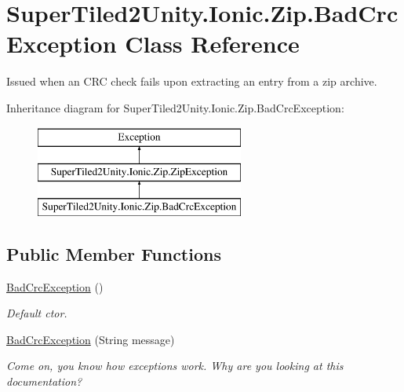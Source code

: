 \hypertarget{class_super_tiled2_unity_1_1_ionic_1_1_zip_1_1_bad_crc_exception}{}\section{Super\+Tiled2\+Unity.\+Ionic.\+Zip.\+Bad\+Crc\+Exception Class Reference}
\label{class_super_tiled2_unity_1_1_ionic_1_1_zip_1_1_bad_crc_exception}


Issued when an C\+RC check fails upon extracting an entry from a zip archive.  


Inheritance diagram for Super\+Tiled2\+Unity.\+Ionic.\+Zip.\+Bad\+Crc\+Exception\+:\begin{figure}[H]
\begin{center}
\leavevmode
\includegraphics[height=3.000000cm]{class_super_tiled2_unity_1_1_ionic_1_1_zip_1_1_bad_crc_exception}
\end{center}
\end{figure}
\subsection*{Public Member Functions}
\begin{DoxyCompactItemize}
\item 
\mbox{\hyperlink{class_super_tiled2_unity_1_1_ionic_1_1_zip_1_1_bad_crc_exception_afe83ef14b0d80d345bd244771860f37d}{Bad\+Crc\+Exception}} ()
\begin{DoxyCompactList}\small\item\em Default ctor. \end{DoxyCompactList}\item 
\mbox{\hyperlink{class_super_tiled2_unity_1_1_ionic_1_1_zip_1_1_bad_crc_exception_a247a6a11c48c97b0e05da71720e0dcee}{Bad\+Crc\+Exception}} (String message)
\begin{DoxyCompactList}\small\item\em Come on, you know how exceptions work. Why are you looking at this documentation? \end{DoxyCompactList}\end{DoxyCompactItemize}
